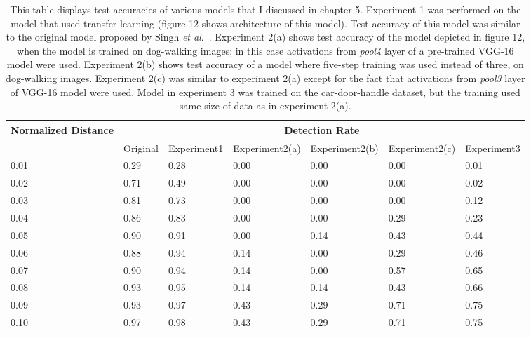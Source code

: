 \documentclass [11pt,letterpaper ,twoside ,openany ]{report}
\begin{document}
    \begin{table}[t]
    \centering
    \small
    \begin{tabular}{ | p{1.8cm} | p{1.8cm} | p{1.8cm} | p{2.2cm} | p{2.2cm} | p{2.2cm} |  p{1.8cm}| }
    \hline
    Normalized Distance &  \multicolumn{6}{|c|}{Detection Rate} \\ \hline
    & Original & Experiment1 & Experiment2(a) & Experiment2(b) & Experiment2(c) & Experiment3 \\ \hline
    0.01 & 0.29 & 0.28 & 0.00 & 0.00 & 0.00 & 0.01 \\ \hline
    0.02 & 0.71 & 0.49 & 0.00 & 0.00 & 0.00 & 0.02 \\ \hline
    0.03 & 0.81 & 0.73 & 0.00 & 0.00 & 0.00 & 0.12 \\ \hline
    0.04 & 0.86 & 0.83 & 0.00 & 0.00 & 0.29 & 0.23 \\ \hline
    0.05 & 0.90 & 0.91 & 0.00 & 0.14 & 0.43 & 0.44 \\ \hline
    0.06 & 0.88 & 0.94 & 0.14 & 0.00 & 0.29 & 0.46 \\ \hline
    0.07 & 0.90 & 0.94 & 0.14 & 0.00 & 0.57 & 0.65 \\ \hline
    0.08 & 0.93 & 0.95 & 0.14 & 0.14 & 0.43 & 0.66 \\ \hline
    0.09 & 0.93 & 0.97 & 0.43 & 0.29 & 0.71 & 0.75 \\ \hline
    0.10 & 0.97 & 0.98 & 0.43 & 0.29 & 0.71 & 0.75 \\ \hline
    \end{tabular}
    \caption{This table displays test accuracies of various models that I discussed in chapter 5. Experiment 1 was performed on the model that used transfer learning (figure 12 shows architecture of this model). Test accuracy of this model was similar to the original model proposed by Singh \textit{et al}.\ \cite{Singh_2016_CVPR}. Experiment 2(a) shows test accuracy of the model depicted in figure 12, when the model is trained on dog-walking images; in this case activations from \textit{pool4} layer of a pre-trained VGG-16 \cite{simonyan2014very} model were used. Experiment 2(b) shows test accuracy of a model where five-step training was used instead of three, on dog-walking images. Experiment 2(c) was similar to experiment 2(a) except for the fact that activations from \textit{pool3} layer of VGG-16 model \cite{simonyan2014very} were used. Model in experiment 3 was trained on the car-door-handle dataset, but the training used same size of data as in experiment 2(a).}
    \end{table}
\end{document}
